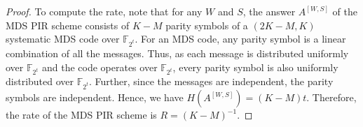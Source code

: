 \documentclass[letterpaper, 10 pt, conference]{ieeeconf}
\newcommand{\A}[2]{A^{[#1,#2]}} %
\newcommand{\GF}[1]{\mathbb{F}_{#1}} %
\begin{document}
\begin{proof}
To compute the rate, note that for any $W$ and $S$, the answer $\A{W}{S}$ of the MDS PIR scheme consists of $K-M$ parity symbols of a $(2K-M,K)$ systematic MDS code over $\GF{2^t}$. For an MDS code, any parity symbol is a linear combination of all the messages. Thus, as each message is distributed uniformly over $\GF{2^t}$ and the code operates over $\GF{2^t}$, every parity symbol is also uniformly distributed over $\GF{2^t}$. Further, since the messages are independent, the parity symbols are independent. Hence, we have $H(\A{W}{S}) = (K - M)t$. %
Therefore, the rate of the MDS PIR scheme is $R=(K-M)^{-1}$. 
\end{proof}


\end{document}
